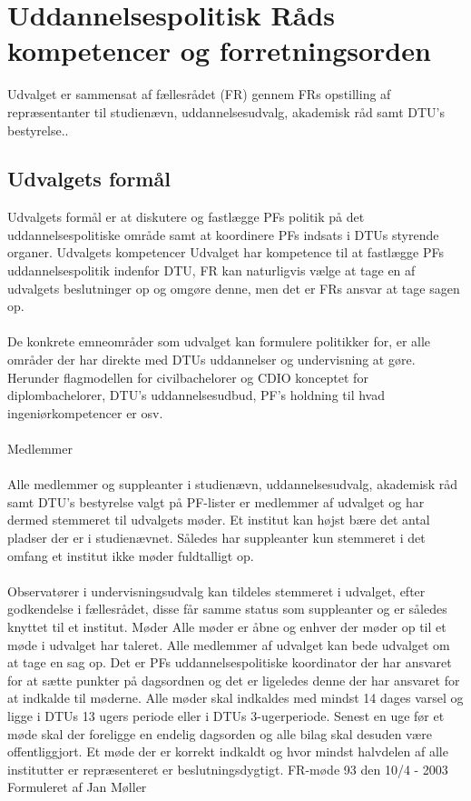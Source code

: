 \section{Uddannelsespolitisk Råds kompetencer og forretningsorden}
Udvalget er sammensat af fællesrådet (FR) gennem FRs opstilling af repræsentanter til studienævn, uddannelsesudvalg, akademisk råd samt DTU’s bestyrelse..\\
\subsection{Udvalgets formål}
Udvalgets formål er at diskutere og fastlægge PFs politik på det uddannelsespolitiske område samt at koordinere PFs
indsats i DTUs styrende organer.
Udvalgets kompetencer
Udvalget har kompetence til at fastlægge PFs uddannelsespolitik indenfor DTU, FR kan naturligvis vælge at tage en af
udvalgets beslutninger op og omgøre denne, men det er FRs ansvar at tage sagen op.
\\
\\
De konkrete emneområder som udvalget kan formulere politikker for, er alle områder der har direkte med DTUs
uddannelser og undervisning at gøre. Herunder flagmodellen for civilbachelorer og CDIO konceptet for diplombachelorer, DTU’s uddannelsesudbud, PF’s holdning til hvad ingeniørkompetencer er osv.
\\
\\
Medlemmer
\\
\\
Alle medlemmer og suppleanter i studienævn, uddannelsesudvalg, akademisk råd samt DTU’s bestyrelse valgt på PF-lister er medlemmer af udvalget og har dermed stemmeret til udvalgets møder. Et institut kan højst bære det antal pladser der er i studienævnet. Således har suppleanter kun stemmeret i det omfang et institut ikke møder fuldtalligt op. 
\\
\\
Observatører i undervisningsudvalg kan tildeles stemmeret i udvalget, efter godkendelse i fællesrådet, disse får samme
status som suppleanter og er således knyttet til et institut.
Møder
Alle møder er åbne og enhver der møder op til et møde i udvalget har taleret. Alle medlemmer af udvalget kan bede
udvalget om at tage en sag op.
Det er PFs uddannelsespolitiske koordinator der har ansvaret for at sætte punkter på dagsordnen og det er ligeledes
denne der har ansvaret for at indkalde til møderne.
Alle møder skal indkaldes med mindst 14 dages varsel og ligge i DTUs 13 ugers periode eller i DTUs 3-ugerperiode.
Senest en uge før et møde skal der foreligge en endelig dagsorden og alle bilag skal desuden være offentliggjort.
Et møde der er korrekt indkaldt og hvor mindst halvdelen af alle institutter er repræsenteret er beslutningsdygtigt.
FR-møde 93 den 10/4 - 2003
Formuleret af Jan Møller
